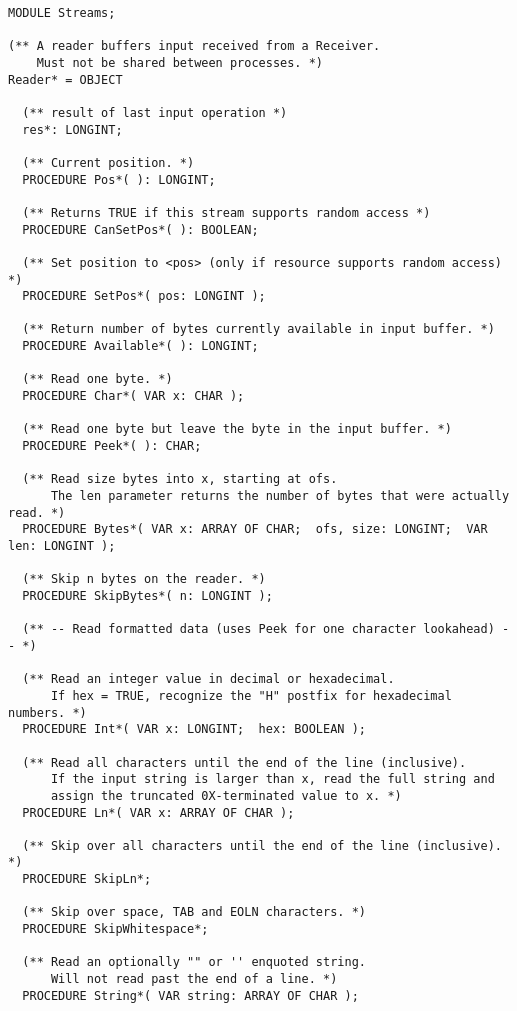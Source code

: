 \documentclass[a4paper,11pt]{article}
\begin{document}
\begin{lstlisting}[language=Oberon,frame=none,caption={Simplified Reader and Writer Interface}]
MODULE Streams;

(** A reader buffers input received from a Receiver.
    Must not be shared between processes. *)
Reader* = OBJECT

  (** result of last input operation *)
  res*: LONGINT;

  (** Current position. *)
  PROCEDURE Pos*( ): LONGINT;

  (** Returns TRUE if this stream supports random access *)
  PROCEDURE CanSetPos*( ): BOOLEAN;

  (** Set position to <pos> (only if resource supports random access) *)
  PROCEDURE SetPos*( pos: LONGINT );

  (** Return number of bytes currently available in input buffer. *)
  PROCEDURE Available*( ): LONGINT;

  (** Read one byte. *)
  PROCEDURE Char*( VAR x: CHAR );

  (** Read one byte but leave the byte in the input buffer. *)
  PROCEDURE Peek*( ): CHAR;

  (** Read size bytes into x, starting at ofs.
      The len parameter returns the number of bytes that were actually read. *)
  PROCEDURE Bytes*( VAR x: ARRAY OF CHAR;  ofs, size: LONGINT;  VAR len: LONGINT );

  (** Skip n bytes on the reader. *)
  PROCEDURE SkipBytes*( n: LONGINT );

  (** -- Read formatted data (uses Peek for one character lookahead) -- *)

  (** Read an integer value in decimal or hexadecimal.
      If hex = TRUE, recognize the "H" postfix for hexadecimal numbers. *)
  PROCEDURE Int*( VAR x: LONGINT;  hex: BOOLEAN );

  (** Read all characters until the end of the line (inclusive).
      If the input string is larger than x, read the full string and
      assign the truncated 0X-terminated value to x. *)
  PROCEDURE Ln*( VAR x: ARRAY OF CHAR );

  (** Skip over all characters until the end of the line (inclusive). *)
  PROCEDURE SkipLn*;

  (** Skip over space, TAB and EOLN characters. *)
  PROCEDURE SkipWhitespace*;

  (** Read an optionally "" or '' enquoted string.
      Will not read past the end of a line. *)
  PROCEDURE String*( VAR string: ARRAY OF CHAR );


\end{lstlisting}
\end{document}
